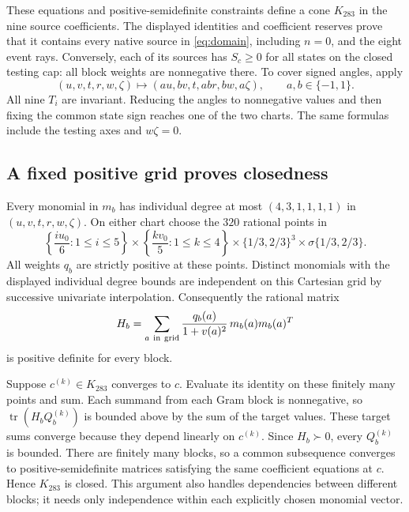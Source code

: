These equations and positive-semidefinite constraints define a cone
$K_{283}$ in the nine source coefficients. The displayed identities
and coefficient reserves prove that it contains every native source
in \eqref{eq:domain}, including $n=0$, and the eight event rays.
Conversely, each of its sources has $S_c\geq0$ for all states on the
closed testing cap: all block weights are nonnegative there.
To cover signed angles, apply
\[
 (u,v,t,r,w,\zeta)\longmapsto
 (a u,b v,t,ab r,bw,a\zeta),\qquad a,b\in\{-1,1\}.
\]
All nine $T_i$ are invariant. Reducing the angles to nonnegative
values and then fixing the common state sign reaches one of the two
charts. The same formulas include the testing axes and $w\zeta=0$.

\subsection*{A fixed positive grid proves closedness}
Every monomial in $m_b$ has individual degree at most
$(4,3,1,1,1,1)$ in $(u,v,t,r,w,\zeta)$.
On either chart choose the $320$ rational points in
\[
 \left\{\frac{i u_0}{6}:1\leq i\leq5\right\}
 \times\left\{\frac{k v_0}{5}:1\leq k\leq4\right\}
 \times\{1/3,2/3\}^{3}\times\sigma\{1/3,2/3\}.
\]
All weights $q_b$ are strictly positive at these points. Distinct
monomials with the displayed individual degree bounds are independent
on this Cartesian grid by successive univariate interpolation.
Consequently the rational matrix
\[
       H_b=\sum_{a\ \rm in\ grid}
              \frac{q_b(a)}{1+v(a)^2}\,m_b(a)m_b(a)^T
\]
is positive definite for every block.

Suppose $c^{(k)}\in K_{283}$ converges to $c$. Evaluate its identity
on these finitely many points and sum. Each summand from each Gram
block is nonnegative, so $\operatorname{tr}(H_bQ_b^{(k)})$ is bounded
above by the sum of the target values. These target sums converge
because they depend linearly on $c^{(k)}$. Since $H_b\succ0$, every
$Q_b^{(k)}$ is bounded. There are finitely many blocks, so a common
subsequence converges to positive-semidefinite matrices satisfying
the same coefficient equations at $c$. Hence $K_{283}$ is closed.
This argument also handles dependencies between different blocks;
it needs only independence within each explicitly chosen monomial vector.
